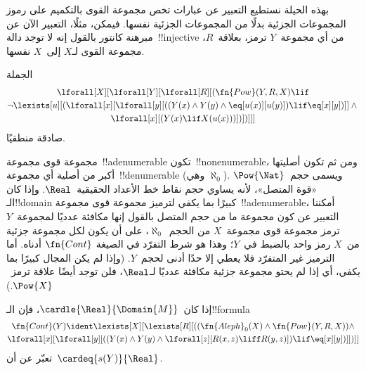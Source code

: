 \documentclass[../../../include/open-logic-section]{subfiles}
\begin{document}
\begin{explain}
بهذه الحيلة نستطيع التعبير عن عبارات تخص مجموعة القوى بالتكميم على
رموز المجموعات الجزئية بدلًا من المجموعات الجزئية نفسها. فيمكن، مثلًا،
التعبير الآن عن مبرهنة كانتور بالقول إنه لا توجد دالة~!!{injective} من
أي مجموعة~$Y$ ترمز، بعلاقة~$R$، مجموعة القوى لـ$X$ إلى~$X$ نفسها.
\end{explain}

\begin{prop}
الجملة
\begin{multline*}
  \lforall[X][\lforall[Y][\lforall[R][(\fn{Pow}(Y, R, X) \lif \\
      \lnot \lexists[u][(\lforall[x][\lforall[y][((Y(x) \land Y(y) \land
            \eq[u(x)][u(y)]) \lif
            \eq[x][y])]] \land {}\\
        \lforall[x][(Y(x) \lif X(u(x)))])])]]]
\end{multline*}
صادقة منطقيًا.
\end{prop}

\begin{explain}
مجموعة قوى مجموعة~!!a{denumerable} تكون~!!{nonenumerable}، ومن ثم
تكون أصليتها أكبر من أصلية أي مجموعة~!!{denumerable} (وهي
$\aleph_0$). ويسمى حجم~$\Pow{\Nat}$ «قوة المتصل»، لأنه يساوي حجم نقاط
خط الأعداد الحقيقية~$\Real$. وإذا كان الـ!!{domain} كبيرًا بما يكفي
لترميز مجموعة قوى مجموعة~!!a{denumerable}، أمكننا التعبير عن كون
  مجموعة ما من حجم المتصل بالقول إنها مكافئة عدديًا لمجموعة~$Y$ ترمز
  مجموعة قوى مجموعة~$X$ من الحجم~$\aleph_0$، على أن يكون لكل مجموعة
  جزئية من~$X$ رمز واحد بالضبط في~$Y$؛ وهذا هو شرط التفرّد في الصيغة
  \(\fn{Cont}\) أدناه. أما الترميز غير المتفرّد فلا يعطي إلا حدًا أدنى
  لحجم~$Y$. (وإذا لم يكن المجال كبيرًا
بما يكفي، أي إذا لم يحتو مجموعة جزئية مكافئة عدديًا لـ$\Real$، فلن
  توجد أيضًا علاقة ترمز~$\Pow{X}$.)
\end{explain}

\begin{prop}
إذا كان~$\cardle{\Real}{\Domain{M}}$، فإن الـ!!{formula}
\begin{multline*}
\fn{Cont}(Y) \ident 
\lexists[X][\lexists[R][((\fn{Aleph}_0(X) \land
      \fn{Pow}(Y, R, X)) \land \\ 
      \lforall[x][\lforall[y][((Y(x) \land {} 
      Y(y) \land \lforall[z][R(x,z) \liff R(y,z)]) \lif \eq[x][y])]])]]
\end{multline*}
تعبّر عن أن~$\cardeq{s(Y)}{\Real}$.
\end{prop}
\end{document}
